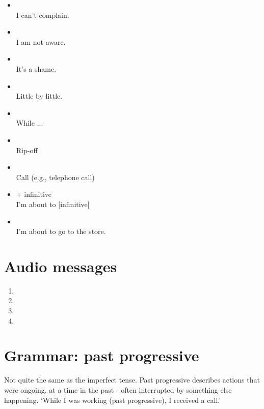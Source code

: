 \begin{itemize}
    \item {} \\
    I can't complain.

    \item {} \\
    I am not aware.

    \item {} \\
    It's a shame.

    \item {} \\
    Little by little.

    \item {} \\
    While ...

    \item {} \\
    Rip-off

    \item {} \\
    Call (e.g., telephone call)

    \item {} + infinitive \\
    I'm about to [infinitive]

    \item {} \\
    I'm about to go to the store.
\end{itemize}

\section{Audio messages}

\begin{enumerate}
    \item {}
    \item {}
    \item {}
    \item {}
\end{enumerate}

\section{Grammar: past progressive}
Not quite the same as the imperfect tense. Past progressive describes actions that were ongoing.
at a time in the past - often interrupted by something else happening. `While I was working (past
progressive), I received a call.'

